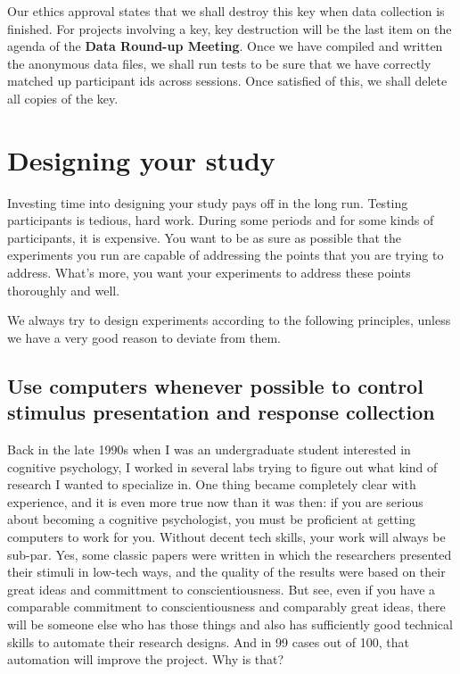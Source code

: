 \documentclass[12pt,]{book}
\theoremstyle{definition}
\theoremstyle{definition}
\theoremstyle{definition}
\theoremstyle{remark}
\begin{document}
Our ethics approval states that we shall destroy this key when data
collection is finished. For projects involving a key, key destruction
will be the last item on the agenda of the \textbf{Data Round-up
Meeting}. Once we have compiled and written the anonymous data files, we
shall run tests to be sure that we have correctly matched up participant
ids across sessions. Once satisfied of this, we shall delete all copies
of the key.

\chapter{Designing your study}\label{designing-your-study}

Investing time into designing your study pays off in the long run.
Testing participants is tedious, hard work. During some periods and for
some kinds of participants, it is expensive. You want to be as sure as
possible that the experiments you run are capable of addressing the
points that you are trying to address. What's more, you want your
experiments to address these points thoroughly and well.

We always try to design experiments according to the following
principles, unless we have a very good reason to deviate from them.

\section{Use computers whenever possible to control stimulus
presentation and response
collection}\label{use-computers-whenever-possible-to-control-stimulus-presentation-and-response-collection}

Back in the late 1990s when I was an undergraduate student interested in
cognitive psychology, I worked in several labs trying to figure out what
kind of research I wanted to specialize in. One thing became completely
clear with experience, and it is even more true now than it was then: if
you are serious about becoming a cognitive psychologist, you must be
proficient at getting computers to work for you. Without decent tech
skills, your work will always be sub-par. Yes, some classic papers were
written in which the researchers presented their stimuli in low-tech
ways, and the quality of the results were based on their great ideas and
committment to conscientiousness. But see, even if you have a comparable
commitment to conscientiousness and comparably great ideas, there will
be someone else who has those things and also has sufficiently good
technical skills to automate their research designs. And in 99 cases out
of 100, that automation will improve the project. Why is that?
\end{document}
